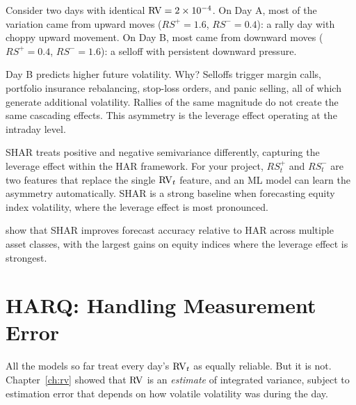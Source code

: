 \begin{intuition}
Consider two days with identical $\operatorname{RV} = 2 \times 10^{-4}$.
On Day A, most of the variation came from upward moves ($RS^+ = 1.6$, $RS^- = 0.4$): a rally day with choppy upward movement.
On Day B, most came from downward moves ($RS^+ = 0.4$, $RS^- = 1.6$): a selloff with persistent downward pressure.

Day B predicts higher future volatility.
Why?
Selloffs trigger margin calls, portfolio insurance rebalancing, stop-loss orders, and panic selling, all of which generate additional volatility.
Rallies of the same magnitude do not create the same cascading effects.
This asymmetry is the leverage effect operating at the intraday level.
\end{intuition}

\begin{projectconnection}
SHAR treats positive and negative semivariance differently, capturing the leverage effect within the HAR framework.
For your project, $RS^+_t$ and $RS^-_t$ are two features that replace the single $\operatorname{RV}_t$ feature, and an ML model can learn the asymmetry automatically.
SHAR is a strong baseline when forecasting equity index volatility, where the leverage effect is most pronounced.
\end{projectconnection}

\citet{PSS2015} show that SHAR improves forecast accuracy relative to HAR across multiple asset classes, with the largest gains on equity indices where the leverage effect is strongest.


\section{HARQ: Handling Measurement Error}
\label{sec:harq}

All the models so far treat every day's $\operatorname{RV}_t$ as equally reliable.
But it is not.
Chapter~\ref{ch:rv} showed that $\operatorname{RV}$ is an \emph{estimate} of integrated variance, subject to estimation error that depends on how volatile volatility was during the day.


